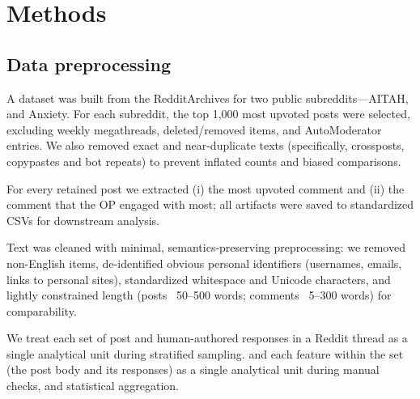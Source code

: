 \section{Methods} \label{sec:Methods}

\subsection{Data preprocessing}
A dataset was built from the RedditArchives for two public subreddits—AITAH, and Anxiety. For each subreddit, the top 1,000 most upvoted posts were selected, excluding weekly megathreads, deleted/removed items, and AutoModerator entries. We also removed exact and near-duplicate texts (specifically, crossposts, copypastes and bot repeats) to prevent inflated counts and biased comparisons.

For every retained post we extracted (i) the most upvoted comment and (ii) the comment that the OP engaged with most; all artifacts were saved to standardized CSVs for downstream analysis.

Text was cleaned with minimal, semantics-preserving preprocessing: we removed non-English items, de-identified obvious personal identifiers (usernames, emails, links to personal sites), standardized whitespace and Unicode characters, and lightly constrained length (posts ~50–500 words; comments ~5–300 words) for comparability.

We treat each set of post and human-authored responses in a Reddit thread as a single analytical unit during stratified sampling.
and each feature within the set (the post body and its responses) as a single analytical unit during manual checks, and statistical aggregation.

